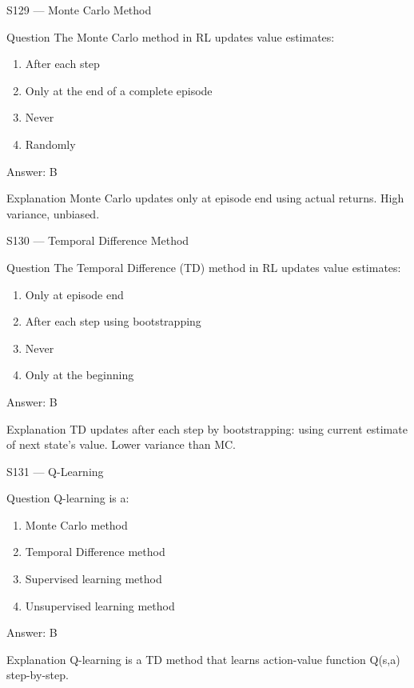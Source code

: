 \documentclass[aspectratio=169,8pt]{beamer}
\begin{document}
	\begin{frame}{S129 --- Monte Carlo Method}
		\begin{block}{Question}
			The Monte Carlo method in RL updates value estimates:
			\begin{enumerate}
				\item After each step
				\item Only at the end of a complete episode
				\item Never
				\item Randomly
			\end{enumerate}
		\end{block}
		\begin{exampleblock}{Answer: B}\end{exampleblock}
		\begin{block}{Explanation}
			Monte Carlo updates only at episode end using actual returns. High variance, unbiased.
		\end{block}
	\end{frame}
	
	\begin{frame}{S130 --- Temporal Difference Method}
		\begin{block}{Question}
			The Temporal Difference (TD) method in RL updates value estimates:
			\begin{enumerate}
				\item Only at episode end
				\item After each step using bootstrapping
				\item Never
				\item Only at the beginning
			\end{enumerate}
		\end{block}
		\begin{exampleblock}{Answer: B}\end{exampleblock}
		\begin{block}{Explanation}
			TD updates after each step by bootstrapping: using current estimate of next state's value. Lower variance than MC.
		\end{block}
	\end{frame}
	
	\begin{frame}{S131 --- Q-Learning}
		\begin{block}{Question}
			Q-learning is a:
			\begin{enumerate}
				\item Monte Carlo method
				\item Temporal Difference method
				\item Supervised learning method
				\item Unsupervised learning method
			\end{enumerate}
		\end{block}
		\begin{exampleblock}{Answer: B}\end{exampleblock}
		\begin{block}{Explanation}
			Q-learning is a TD method that learns action-value function Q(s,a) step-by-step.
		\end{block}
	\end{frame}
	
\end{document}
